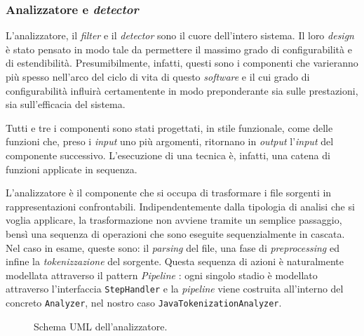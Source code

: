 \subsubsection*{Analizzatore e \textit{detector}}
L'analizzatore, il \textit{filter} e il \textit{detector} sono il cuore dell'intero sistema.
%
Il loro \textit{design} è stato pensato in modo tale da permettere il massimo grado di configurabilità e di estendibilità.
%
Presumibilmente, infatti, questi sono i componenti che varieranno più spesso nell'arco del ciclo di vita di questo \textit{software} e il cui grado di configurabilità influirà certamentente in modo preponderante sia sulle prestazioni, sia sull'efficacia del sistema.

Tutti e tre i componenti sono stati progettati, in stile funzionale, come delle funzioni che, preso i \textit{input} uno più argomenti, ritornano in \textit{output} l'\textit{input} del componente successivo.
%
L'esecuzione di una tecnica è, infatti, una catena di funzioni applicate in sequenza.

L'analizzatore è il componente che si occupa di trasformare i file sorgenti in rappresentazioni confrontabili.
%
Indipendentemente dalla tipologia di analisi che si voglia applicare, la trasformazione non avviene tramite un semplice passaggio, bensì una sequenza di operazioni che sono eseguite sequenzialmente in cascata.
%
Nel caso in esame, queste sono: il \textit{parsing} del file, una fase di \textit{preprocessing} ed infine la \textit{tokenizzazione} del sorgente.
%
Questa sequenza di azioni è naturalmente modellata attraverso il pattern \textit{Pipeline} \cite{pipeline-pattern}: ogni singolo stadio è modellato attraverso l'interfaccia \texttt{StepHandler} e la \textit{pipeline} viene costruita all'interno del concreto \texttt{Analyzer}, nel nostro caso \texttt{JavaTokenizationAnalyzer}.

\begin{figure}[h!]
    \caption{Schema UML dell'analizzatore.}
    \label{img:02-analyzer}
\end{figure}

